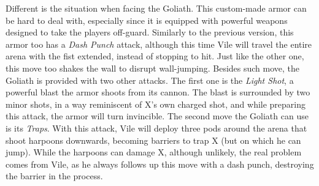 Different is the situation when facing the Goliath. This custom-made armor can be hard to deal with, especially since it is equipped with powerful weapons designed to take the players off-guard. Similarly to the previous version, this armor too has a \emph{Dash Punch} attack, although this time Vile will travel the entire arena with the fist extended, instead of stopping to hit. Just like the other one, this move too shakes the wall to disrupt wall-jumping. Besides such move, the Goliath is provided with two other attacks. The first one is the \emph{Light Shot}, a powerful blast the armor shoots from its cannon. The blast is surrounded by two minor shots, in a way reminiscent of X's own charged shot, and while preparing this attack, the armor will turn invincible. The second move the Goliath can use is its \emph{Traps}. With this attack, Vile will deploy three pods around the arena that shoot harpoons downwards, becoming barriers to trap X (but on which he can jump). While the harpoons can damage X, although unlikely, the real problem comes from Vile, as he always follows up this move with a dash punch, destroying the barrier in the process.
